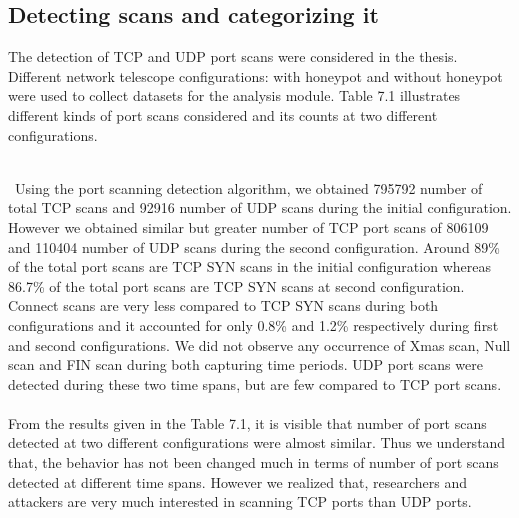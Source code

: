 \subsection{Detecting scans and categorizing it}
The detection of TCP and UDP port scans were considered in the thesis.
Different network telescope configurations: with honeypot and without honeypot were used to collect datasets for the analysis module.
Table 7.1 illustrates different kinds of port scans considered and its counts at two different configurations.
\begin{table}[t!]
    \centering
    \caption{Different Kinds of Port Scans for Two Datasets and its Counts}
\end{table}
\\\ 
Using the port scanning detection algorithm, we obtained 795792 number of total TCP scans and 92916 number of UDP scans during the initial configuration.
However we obtained similar but greater number of TCP port scans of 806109 and 110404 number of UDP scans during the second configuration. 
Around 89\% of the total port scans are TCP SYN scans in the initial configuration whereas 86.7\% of the total port scans are  TCP SYN scans at second configuration. 
Connect scans are very less compared to TCP SYN scans during both configurations and it accounted for only 0.8\% and 1.2\%  respectively during first and second configurations.
We did not observe any occurrence of Xmas scan, Null scan and FIN scan during both capturing time periods.
UDP port scans were detected during these two time spans, but are few compared to TCP port scans.\\\\
From the results given in the Table 7.1, it is visible that number of port scans detected at two different configurations were almost similar. 
Thus we understand that, the behavior has not been changed much in terms of number of port scans detected at different time spans.
However we realized that, researchers and attackers are very much interested in scanning TCP ports than UDP ports.
